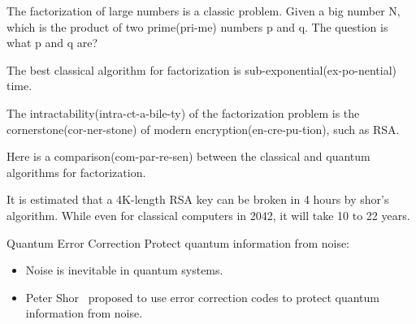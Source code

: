 \documentclass[10pt]{beamer}
\begin{document}
\begin{CJK}{UTF8}{gbsn}
{The factorization of large numbers is a classic problem.%
Given a big number N, which is the product of two prime(pri-me) numbers p and q. The  question is what p and q are?

The best classical algorithm for factorization is sub-exponential(ex-po-nential) time.

The intractability(intra-ct-a-bile-ty) of the factorization problem is the cornerstone(cor-ner-stone) of modern encryption(en-cre-pu-tion), such as RSA.


Here is a comparison(com-par-re-sen) between the classical and quantum algorithms for factorization.

It is estimated that a 4K-length RSA key can be broken in 4 hours by shor's algorithm. While even for classical computers in 2042, it will take 10 to 22 years.}


\begin{frame}[fragile]{Quantum Error Correction}
  Protect quantum information from noise:
  \begin{itemize}
    \item Noise is inevitable in quantum systems.
    \item Peter Shor~ proposed to use error correction codes to protect quantum information from noise.
      
  \end{itemize}
\end{frame}
\end{CJK}
\end{document}
